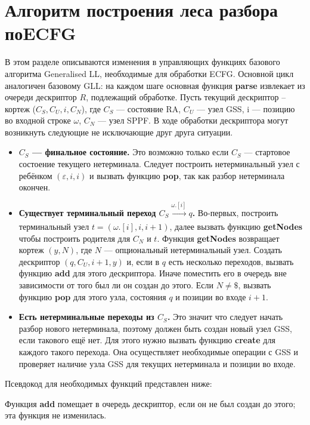 \documentclass[14pt]{matmex-diploma-custom}
\begin{document}
	\section{Алгоритм построения леса разбора по\newline ECFG}
	В этом разделе описываются изменения в управляющих функциях базового алгоритма 
	Generalised LL, необходимые для обработки ECFG. Основной цикл аналогичен базовому
	GLL: на каждом шаге основная функция \textbf{parse} извлекает из очереди дескриптор
	$R$, подлежащий обработке. Пусть текущий дескриптор -- кортеж ($C_S, C_U, i, C_N$),
	где $C_S$ --- состояние RA, $C_U$ --- узел GSS, i --- позицию во входной строке 
	$\omega$, $C_N$ --- узел SPPF. В ходе обработки дескриптора могут возникнуть следующие
	не исключающие друг друга ситуации.
	\begin{itemize} 
		\item \textbf{$C_S$ --- финальное состояние.} Это возможно только если $C_S$
		--- стартовое состоение текущего нетерминала. Следует построить нетерминальный
		узел с ребёнком $(\varepsilon, i, i)$ и вызвать функцию \textbf{pop}, так как
		разбор нетерминала окончен.
		
		\item \textbf{Существует терминальный переход $C_S \xrightarrow[]{\omega.[i]} q$.}
		Во-первых, построить терминальный узел $ t = (\omega.[i], i, i+1) $, далее 
		вызвать функцию \textbf{getNodes} чтобы построить родителя для $ C_N $ и $ t $. 
		Функция \textbf{getNodes} возвращает кортеж $ (y, N) $, где $N$ --- опциональный
		нетерминальный узел. Создать дескриптор $ (q, C_U, i+1, y) $ и, если
        в $q$ есть несколько переходов, вызвать функцию \textbf{add} для этого дескриптора.
        Иначе поместить его в очередь вне зависимости от того был ли он создан до этого. 
        Если $ N \neq \$$,
		вызвать функцию \textbf{pop} для этого узла, состояния $ q $ и позиции во
		входе $ i + 1 $.
		
		\item\textbf{ Есть нетерминальные переходы из $C_S$.}
		Это значит что следует начать разбор нового нетерминала, поэтому должен быть
		создан новый узел GSS, если такового ещё нет. Для этого нужно вызвать функцию
		\textbf{create} для каждого такого перехода. Она осуществляет необходимые
		операции с GSS и проверяет наличие узла GSS для текущих нетерминала и 
		позиции во входе.
	\end{itemize}
	Псевдокод для необходимых функций представлен ниже:
	
	Функция \textbf{add} помещает в очередь дескриптор, если он не был создан до этого; эта функция не изменилась.
	
	
\end{document}
